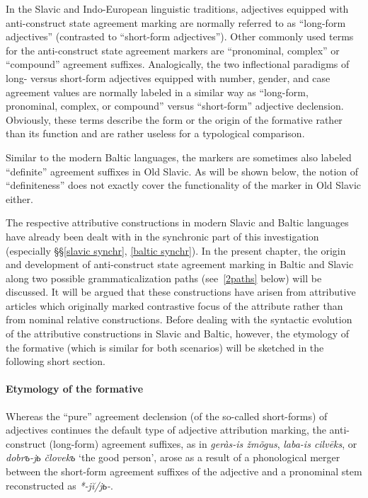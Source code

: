 In the Slavic and Indo-European linguistic traditions, adjectives equipped with anti-construct state agreement marking are normally referred to as “long-form adjectives” (contrasted to “short-form adjectives”). Other commonly used terms for the anti-construct state agreement markers are “pronominal, complex” or “compound” agreement suffixes. Analogically, the two inflectional paradigms of long- versus short-form adjectives equipped with number, gender, and case agreement values are normally labeled in a similar way as “long-form, pronominal, complex, or compound” versus “short-form” adjective declension. Obviously, these terms describe the form or the origin of the formative rather than its function and are rather useless for a typological comparison.

Similar to the modern Baltic languages, the markers are sometimes also labeled “definite” agreement suffixes in Old Slavic. As will be shown below, the notion of “definiteness” does not exactly cover the functionality of the marker in Old Slavic either.

The respective attributive constructions in modern Slavic and Baltic languages have already been dealt with in the synchronic part of this investigation (especially \S\S\ref{slavic synchr}, \ref{baltic synchr}). In the present chapter, the origin and development of anti-construct state agreement marking in Baltic and Slavic along two possible grammaticalization paths (see~\ref{2paths} below) will be discussed. It will be argued that these constructions have arisen from attributive articles which originally marked contrastive focus of the attribute rather than from nominal relative constructions. Before dealing with the syntactic evolution of the attributive constructions in Slavic and Baltic, however, the etymology of the formative (which is similar for both scenarios) will be sketched in the following short section.

\paragraph{Etymology of the formative} 
Whereas the “pure” agreement declension (of the so-called short-forms) of adjectives continues the  default type of adjective attribution marking, the anti-construct (long-form) agreement suffixes, as in  \textit{geràs-is žmõgus},  \textit{laba-is cilvēks}, or  \textit{dobrъ-jь človekъ} ‘the good person’, arose as a result of a phonological merger between the short-form agreement suffixes of the adjective and a pronominal stem reconstructed as  \textit{*-jĭ/jь-}.

